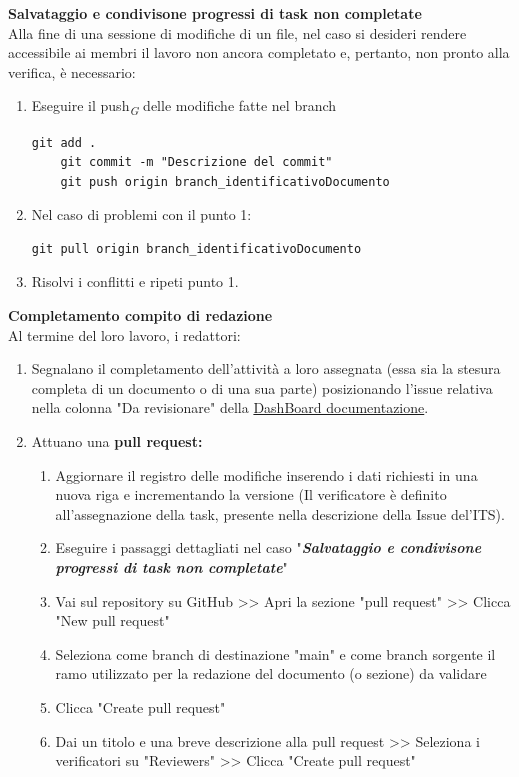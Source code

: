 \documentclass{article}
\begin{document}
\textbf{Salvataggio e condivisone progressi di task non completate}\\
Alla fine di una sessione di modifiche di un file, nel caso si desideri rendere accessibile ai membri il lavoro non ancora completato e, pertanto, non pronto alla verifica, è necessario:
\begin{enumerate}
    \item Eseguire il push\textsubscript{\textit{G}}  delle modifiche fatte nel branch
          \begin{lstlisting}[style=code]
    git add .
    git commit -m "Descrizione del commit"
    git push origin branch_identificativoDocumento
        \end{lstlisting}

    \item Nel caso di problemi con il punto 1:
          \begin{lstlisting}[style=code]
   git pull origin branch_identificativoDocumento
        \end{lstlisting}
    \item Risolvi i conflitti e ripeti punto 1.
\end{enumerate}
\vspace{0.3cm}
\textbf{Completamento compito di redazione}\\
Al termine del loro lavoro, i redattori:
\begin{enumerate}
    \item Segnalano il completamento dell'attività a loro assegnata (essa sia la stesura completa di un documento o di una sua parte) posizionando l'issue relativa nella colonna "Da revisionare" della  \href{https://github.com/orgs/ByteOps-swe/projects/1/views/1}{DashBoard documentazione}.
    \item Attuano una \textbf{pull request:}
          \begin{enumerate}
              \item Aggiornare il registro delle modifiche inserendo i dati richiesti in  una nuova riga e incrementando la versione (Il verificatore è definito all'assegnazione della task, presente nella descrizione della Issue del'ITS).
              \item Eseguire i passaggi dettagliati nel caso "\textit{\textbf{Salvataggio e condivisone progressi di task non completate}}"
              \item Vai sul repository su GitHub >> Apri la sezione "pull request" >> Clicca "New pull request"
              \item Seleziona come branch di destinazione "main" e come branch sorgente il ramo utilizzato per la redazione del documento (o sezione) da validare
              \item Clicca "Create pull request"
              \item Dai un titolo e una breve descrizione alla pull request >> Seleziona i verificatori su "Reviewers" >> Clicca "Create pull request"
          \end{enumerate}
\end{enumerate}
\end{document}
